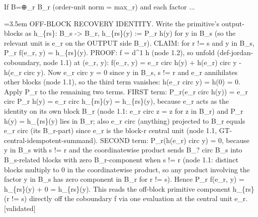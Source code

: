 \documentclass{article}
\newcommand{\step}[1]{\par\noindent\hangindent=3.5em\hangafter=1%
  \makebox[3.5em][l]{\textbf{#1.}}}
\newcommand{\steptag}[1]{\hfill{\small\textsf{[#1]}}}
\begin{document}
\begin{proofbox}{If B=⊕\_r B\_r (order-unit norm = max\_r) and each factor ...}
\step{1.6} OFF-BLOCK RECOVERY IDENTITY. Write the primitive's output-blocks as h\_\{rs\}: B\_s -> B\_r, h\_\{rs\}(y) := P\_r h(y) for y in B\_s (so the relevant unit is e\_r on the OUTPUT side B\_r). CLAIM: for r != s and y in B\_s, P\_r f(e\_r, y) = h\_\{rs\}(y). PROOF: f = d\textasciicircum{}1 h (node 1.2), so unfold (def-jordan-coboundary, node 1.1) at (e\_r, y): f(e\_r, y) = e\_r circ h(y) + h(e\_r) circ y - h(e\_r circ y). Now e\_r circ y = 0 since y in B\_s, s != r and e\_r annihilates other blocks (node 1.1), so the third term vanishes: h(e\_r circ y) = h(0) = 0. Apply P\_r to the remaining two terms. FIRST term: P\_r(e\_r circ h(y)) = e\_r circ P\_r h(y) = e\_r circ h\_\{rs\}(y) = h\_\{rs\}(y), because e\_r acts as the identity on its own block B\_r (node 1.1: e\_r circ z = z for z in B\_r) and P\_r h(y) = h\_\{rs\}(y) lies in B\_r; also e\_r circ (anything) projected to B\_r equals e\_r circ (its B\_r-part) since e\_r is the block-r central unit (node 1.1, GT-central-idempotent-summand). SECOND term: P\_r(h(e\_r) circ y) = 0, because y in B\_s with s != r and the coordinatewise product sends B\_? circ B\_s into B\_s-related blocks with zero B\_r-component when s != r (node 1.1: distinct blocks multiply to 0 in the coordinatewise product, so any product involving the factor y in B\_s has zero component in B\_r for r != s). Hence P\_r f(e\_r, y) = h\_\{rs\}(y) + 0 = h\_\{rs\}(y). This reads the off-block primitive component h\_\{rs\} (r != s) directly off the coboundary f via one evaluation at the central unit e\_r. \steptag{validated} \\[4pt]

\end{proofbox}
\end{document}
